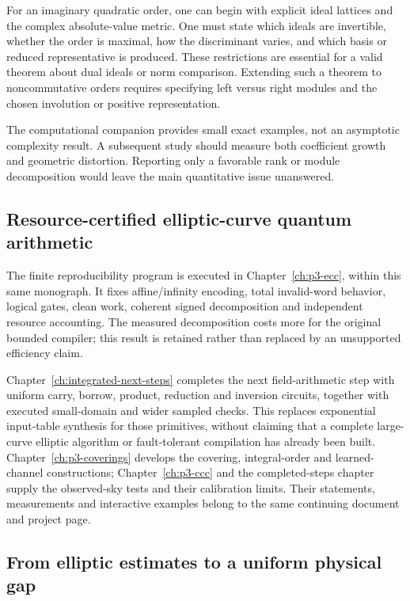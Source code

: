 For an imaginary quadratic order, one can begin with explicit ideal lattices
and the complex absolute-value metric. One must state which ideals are
invertible, whether the order is maximal, how the discriminant varies, and
which basis or reduced representative is produced. These restrictions are
essential for a valid theorem about dual ideals or norm comparison. Extending
such a theorem to noncommutative orders requires specifying left versus right
modules and the chosen involution or positive representation.

The computational companion provides small exact examples, not an asymptotic
complexity result. A subsequent study should measure both coefficient growth
and geometric distortion. Reporting only a favorable rank or module
decomposition would leave the main quantitative issue unanswered.

\subsection{Resource-certified elliptic-curve quantum arithmetic}
The finite reproducibility program is executed in Chapter~\ref{ch:p3-ecc}, within this same monograph. It fixes affine/infinity encoding, total invalid-word behavior, logical gates, clean work, coherent signed decomposition and independent resource accounting. The measured decomposition costs more for the original bounded compiler; this result is retained rather than replaced by an unsupported efficiency claim.

Chapter~\ref{ch:integrated-next-steps} completes the next field-arithmetic step with uniform carry, borrow, product, reduction and inversion circuits, together with executed small-domain and wider sampled checks. This replaces exponential input-table synthesis for those primitives, without claiming that a complete large-curve elliptic algorithm or fault-tolerant compilation has already been built. Chapter~\ref{ch:p3-coverings} develops the covering, integral-order and learned-channel constructions; Chapter~\ref{ch:p3-ccc} and the completed-steps chapter supply the observed-sky tests and their calibration limits. Their statements, measurements and interactive examples belong to the same continuing document and project page.

\subsection{From elliptic estimates to a uniform physical gap}

